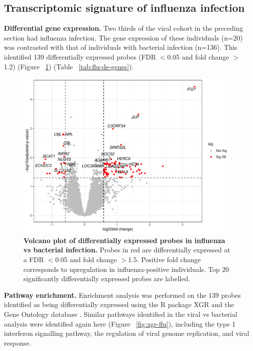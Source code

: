 \subsection{Transcriptomic signature of influenza infection}
\textbf{Differential gene expression.} Two thirds of the viral cohort in the preceding section had influenza infection. The gene expression of these individuals (n=20) was contrasted with that of individuals with bacterial infection (n=136). This identified 139 differentially expressed probes (FDR $<$0.05 and fold change $>$1.2) (Figure ~\ref{fig:vp-flu}) (Table ~\ref{tab:flu-de-genes}).

\FloatBarrier
\begin{figure}[htbp]
\centering
\includegraphics[width=\textwidth]{./Results3/Images/vp-flu.pdf}
\caption[Volcano plot of differentially expressed probes in influenza infection]{\textbf{Volcano plot of differentially expressed probes in influenza vs bacterial infection.} Probes in red are differentially expressed at a FDR $<$0.05 and fold change $>$1.5. Positive fold change corresponds to upregulation in influenza-positive individuals. Top 20 significantly differentially expressed probes are labelled.}
\label{fig:vp-flu}
\end{figure}
\FloatBarrier

\textbf{Pathway enrichment.} Enrichment analysis was performed on the 139 probes identified as being differentially expressed using the R package XGR \parencite{Fang2016} and the Gene Ontology database \parencite{GO2019} \parencite{Ashburner2000}. Similar pathways identified in the viral vs bacterial analysis were identified again here (Figure ~\ref{fig:xgr-flu}), including the type 1 interferon signalling pathway, the regulation of viral genome replication, and viral response.

